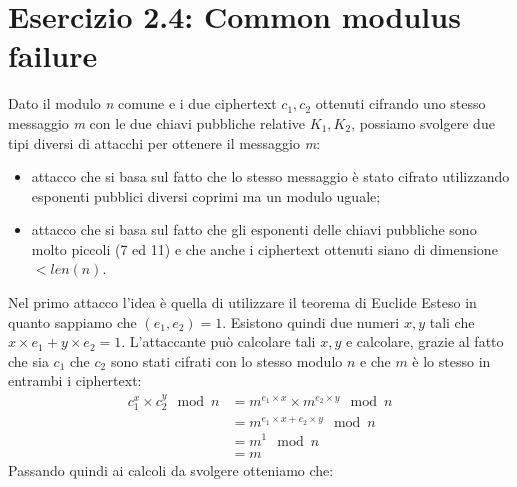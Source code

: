 \documentclass{article}
\begin{document}
\section*{Esercizio 2.4: Common modulus failure}
Dato il modulo \textit{n} comune e i due ciphertext $c_1, c_2$ ottenuti cifrando uno stesso messaggio \textit{m} con le due chiavi pubbliche relative $K_1, K_2$, possiamo svolgere due tipi diversi di attacchi per ottenere il messaggio \textit{m}:
\begin{itemize}
    \item attacco che si basa sul fatto che lo stesso messaggio è stato cifrato utilizzando esponenti pubblici diversi coprimi ma un modulo uguale;
    \item attacco che si basa sul fatto che gli esponenti delle chiavi pubbliche sono molto piccoli (7 ed 11) e che anche i ciphertext ottenuti siano di dimensione $< len(n)$.
\end{itemize}
Nel primo attacco l'idea è quella di utilizzare il teorema di Euclide Esteso in quanto sappiamo che $(e_1, e_2) = 1$. Esistono quindi due numeri $x, y$ tali che $x \times e_1 + y \times e_2 = 1$. L'attaccante può calcolare tali $x,y$ e calcolare, grazie al fatto che sia $c_1$ che $c_2$ sono stati cifrati con lo stesso modulo $n$ e che $m$ è lo stesso in entrambi i ciphertext:  
\begin{equation}
\begin{split}
c_1^x \times c_2^y \mod{n}&= m^{e_1 \times x} \times m^{e_2 \times y} \mod{n}\\
                          &= m^{e_1 \times x + e_2 \times y} \mod{n}\\
                          &= m^1 \mod{n} \\
                          &= m
\end{split}
\end{equation}
Passando quindi ai calcoli da svolgere otteniamo che:
\end{document}
